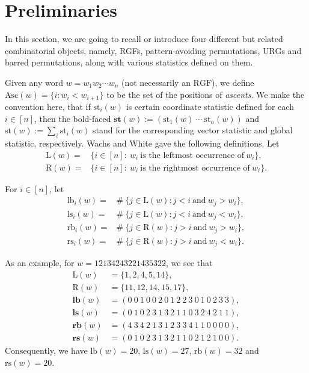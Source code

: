 \documentclass[12pt]{amsart}
\numberwithin{equation}{section}
\theoremstyle{plain}
\theoremstyle{definition}
\def\RGF{\mathrm{RGF}}
\def\lb{\mathrm{lb}}
\def\ls{\mathrm{ls}}
\def\rb{\mathrm{rb}}
\def\rs{\mathrm{rs}}
\def\Asc{\mathrm{Asc}}
\def\LL{\mathrm{L}}
\def\RR{\mathrm{R}}
\def\st{\mathrm{st}}
\def\bst{\mathbf{st}}
\def\blb{\mathbf{lb}}
\def\bls{\mathbf{ls}}
\def\brb{\mathbf{rb}}
\def\brs{\mathbf{rs}}
\def\st{\mathrm{st}}
\begin{document}
\section{Preliminaries}\label{sec:pre}
In this section, we are going to recall or introduce four different but related combinatorial objects, namely, RGFs, pattern-avoiding permutations, URGs and barred permutations, along with various statistics defined on them.

Given any word $w=w_1 w_2 \cdots w_n$ (not necessarily an $\RGF$),
we define $\Asc(w) =\{i: w_i < w_{i+1}\}$ to be
the set of the positions of \emph{ascents}. We make the convention here, that if $\st_i(w)$ is certain coordinate statistic defined for each $i\in[n]$, then the bold-faced $\bst(w):=(\st_1(w)~\cdots~\st_n(w))$ and $\st(w):=\sum_i\st_i(w)$ stand for the corresponding vector statistic and global statistic, respectively.
Wachs and White\cite{WW} gave the following definitions. Let
\begin{align*}
  \LL(w)=&\{i \in [n]:~ w_i~ \text{is the leftmost occurrence of}~ w_i\},\\[5pt]
   \RR(w)=&\{i \in [n]:~ w_i~ \text{is the rightmost occurrence of}~ w_i\}.
\end{align*}

For $i \in [n]$, let
\begin{align*}
   \lb_i(w)=&\#~\{j \in \LL(w): j<i ~\text{and}~ w_j > w_i\}, \\[5pt]
  \ls_i(w)=&\#~\{j \in \LL(w): j<i ~\text{and}~ w_j < w_i\}, \\[5pt]
  \rb_i(w)=&\#~\{j \in \RR(w): j>i ~\text{and}~ w_j > w_i\}, \\[5pt]
  \rs_i(w)=&\#~\{j \in \RR(w): j>i ~\text{and}~ w_j < w_i\}.
\end{align*}


As an example, for $w=12134243221435322$, we see that
\begin{align*}
  \LL(w) &=\{1,2,4,5,14\},\\[5pt]
  \RR(w) &=\{11,12,14,15,17\},\\[5pt]
  \blb(w)&= (0~0~1~0~0~2~0~1~2~2~3~0~1~0~2~3~3), \\[5pt]
  \bls(w)&= (0~1~0~2~3~1~3~2~1~1~0~3~2~4~2~1~1), \\[5pt]
  \brb(w)&= (4~3~4~2~1~3~1~2~3~3~4~1~1~0~0~0~0), \\[5pt]
  \brs(w)&= (0~1~0~2~3~1~3~2~1~1~0~2~1~2~1~0~0).
\end{align*}
Consequently, we have $\lb(w)=20$, $\ls(w)=27$, $\rb(w)=32$ and $\rs(w)=20$.
\end{document}
